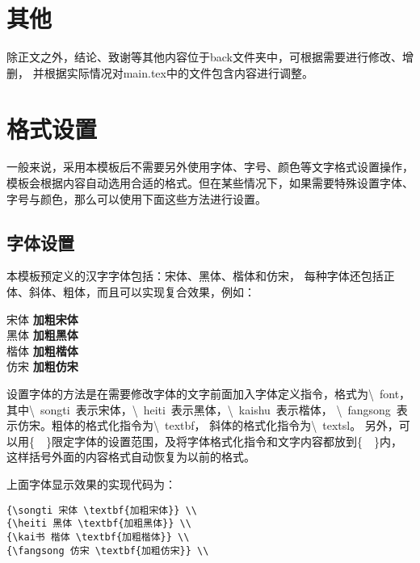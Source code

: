 \section{其他}

除正文之外，结论、致谢等其他内容位于back文件夹中，可根据需要进行修改、增删，
并根据实际情况对main.tex中的文件包含内容进行调整。

\section{格式设置}
一般来说，采用本模板后不需要另外使用字体、字号、颜色等文字格式设置操作，
模板会根据内容自动选用合适的格式。但在某些情况下，如果需要特殊设置字体、
字号与颜色，那么可以使用下面这些方法进行设置。

\subsection{字体设置}
本模板预定义的汉字字体包括：{\songti 宋体}、{\heiti 黑体}、{\kaishu 楷体}和{\fangsong 仿宋}，
每种字体还包括正体、斜体、粗体，而且可以实现复合效果，例如：

\begin{flushleft}
  {
  {\songti 宋体 \textbf{加粗宋体}} \\
  {\heiti 黑体 \textbf{加粗黑体}} \\
  {\kaishu 楷体 \textbf{加粗楷体}} \\
  {\fangsong 仿宋 \textbf{加粗仿宋}} \\
  }
\end{flushleft}

设置字体的方法是在需要修改字体的文字前面加入字体定义指令，格式为\textbackslash~font，
其中\textbackslash~songti~表示宋体，\textbackslash~heiti~表示黑体，\textbackslash~kaishu~表示楷体，
\textbackslash~fangsong~表示仿宋。粗体的格式化指令为\textbackslash~textbf，
斜体的格式化指令为\textbackslash~textsl。
另外，可以用\{~~\}限定字体的设置范围，及将字体格式化指令和文字内容都放到\{~~\}内，
这样括号外面的内容格式自动恢复为以前的格式。

上面字体显示效果的实现代码为：

\begin{lstlisting}
{\songti 宋体 \textbf{加粗宋体}} \\
{\heiti 黑体 \textbf{加粗黑体}} \\
{\kai书 楷体 \textbf{加粗楷体}} \\
{\fangsong 仿宋 \textbf{加粗仿宋}} \\
\end{lstlisting}

